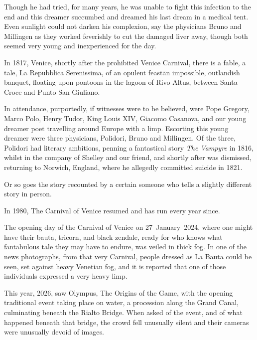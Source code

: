 Though he had tried, for many years, he was unable to fight this
infection to the end and this dreamer succumbed and dreamed his last
dream in a medical tent. Even sunlight could not darken his
complexion, say the physicians Bruno and Millingen as they worked
feverishly to cut the damaged liver away, though both seemed very
young and inexperienced for the day.

In 1817, Venice, shortly after the prohibited Venice Carnival, there
is a fable, a tale, La Repubblica Serenissima, of an opulent feast\=an
impossible, outlandish banquet, floating upon pontoons in the lagoon
of Rivo Altus, between Santa Croce and Punto San Giuliano.

In attendance, purportedly, if witnesses were to be believed, were Pope
Gregory, Marco Polo, Henry Tudor, King Louis XIV, Giacomo Casanova,
and our young dreamer poet travelling around Europe with a limp. Escorting
this young dreamer were three physicians, Polidori, Bruno and
Millingen. Of the three, Polidori had literary ambitions, penning a
fantastical story \textit{The Vampyre} in 1816, whilst in the company of
Shelley and our friend, and shortly after was dismissed, returning to
Norwich, England, where he allegedly committed suicide in 1821.

Or so goes the story recounted by a certain someone who tells a
slightly different story in person.

In 1980, The Carnival of Venice resumed and has run every year since.

The opening day of the Carnival of Venice on 27~January~2024, where
one might have their bauta, tricorn, and black zendale, ready for who
knows what fantabulous tale they may have to endure, was veiled in
thick fog. In one of the news photographs, from that very Carnival,
people dressed as La Bauta could be seen, set against heavy Venetian
fog, and it is reported that one of those individuals expressed a very
heavy limp.

This year, 2026, saw Olympus, The Origins of the Game, with the
opening traditional event taking place on water, a procession along
the Grand Canal, culminating beneath the Rialto Bridge. When asked of
the event, and of what happened beneath that bridge, the crowd fell
unusually silent and their cameras were unusually devoid of images.

\endinput

Sadie, thank you for asking me about this. I thought about this piece
which I wrote for a poetry evening a few years ago, I read it there
once, but it is unpublished. It is based on a mix of true events and
fiction and I have reworked and updated it for your format,

